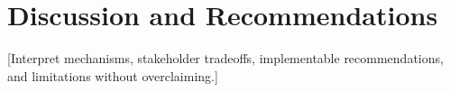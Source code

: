 \section{Discussion and Recommendations}
[Interpret mechanisms, stakeholder tradeoffs, implementable recommendations, and limitations without overclaiming.]
